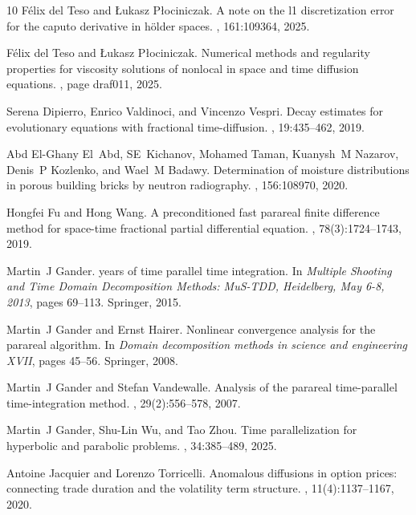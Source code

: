 \documentclass[12pt,a4paper]{article}
\begin{document}
\begin{thebibliography}{10}
	F{\'e}lix del Teso and {\L}ukasz P{\l}ociniczak.
	\newblock A note on the l1 discretization error for the caputo derivative in
	h{\"o}lder spaces.
	, 161:109364, 2025.
	
	F{\'e}lix del Teso and {\L}ukasz P{\l}ociniczak.
	\newblock Numerical methods and regularity properties for viscosity solutions
	of nonlocal in space and time diffusion equations.
	, page draf011, 2025.
	
	Serena Dipierro, Enrico Valdinoci, and Vincenzo Vespri.
	\newblock Decay estimates for evolutionary equations with fractional
	time-diffusion.
	, 19:435--462, 2019.
	
	Abd El-Ghany El~Abd, SE~Kichanov, Mohamed Taman, Kuanysh~M Nazarov, Denis~P
	Kozlenko, and Wael~M Badawy.
	\newblock Determination of moisture distributions in porous building bricks by
	neutron radiography.
	, 156:108970, 2020.
	
	Hongfei Fu and Hong Wang.
	\newblock A preconditioned fast parareal finite difference method for
	space-time fractional partial differential equation.
	, 78(3):1724--1743, 2019.
	
	Martin~J Gander.
	 years of time parallel time integration.
	\newblock In {\em Multiple Shooting and Time Domain Decomposition Methods:
		MuS-TDD, Heidelberg, May 6-8, 2013}, pages 69--113. Springer, 2015.
	
	Martin~J Gander and Ernst Hairer.
	\newblock Nonlinear convergence analysis for the parareal algorithm.
	\newblock In {\em Domain decomposition methods in science and engineering
		XVII}, pages 45--56. Springer, 2008.
	
	Martin~J Gander and Stefan Vandewalle.
	\newblock Analysis of the parareal time-parallel time-integration method.
	, 29(2):556--578, 2007.
	
	Martin~J Gander, Shu-Lin Wu, and Tao Zhou.
	\newblock Time parallelization for hyperbolic and parabolic problems.
	, 34:385--489, 2025.
	
	Antoine Jacquier and Lorenzo Torricelli.
	\newblock Anomalous diffusions in option prices: connecting trade duration and
	the volatility term structure.
	, 11(4):1137--1167, 2020.
	

\end{thebibliography}
\end{document}
